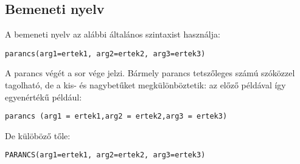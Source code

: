 \subsection{Bemeneti nyelv}
A bemeneti nyelv az alábbi általános szintaxist használja: 

\lstset{escapeinside=`', xleftmargin=10pt, frame=single, basicstyle=\ttfamily\footnotesize, language=sh}
\begin{lstlisting}
parancs(arg1=ertek1, arg2=ertek2, arg3=ertek3)
\end{lstlisting}

\noindent A parancs végét a sor vége jelzi. Bármely parancs tetszőleges számú szóközzel tagolható, de a kis- és nagybetűket megkülönböztetik: az előző példával így egyenértékű például:

\lstset{escapeinside=`', xleftmargin=10pt, frame=single, basicstyle=\ttfamily\footnotesize, language=sh}
\begin{lstlisting}
parancs (arg1 = ertek1,arg2 = ertek2,arg3 = ertek3)
\end{lstlisting}

\noindent De külöböző tőle:

\lstset{escapeinside=`', xleftmargin=10pt, frame=single, basicstyle=\ttfamily\footnotesize, language=sh}
\begin{lstlisting}
PARANCS(arg1=ertek1, arg2=ertek2, arg3=ertek3)
\end{lstlisting}

